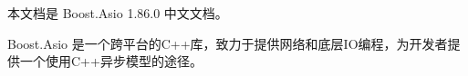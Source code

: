 \documentclass[utf8]{book}
\begin{document}
	本文档是 Boost.Asio 1.86.0 中文文档。
	
	Boost.Asio 是一个跨平台的C++库，致力于提供网络和底层IO编程，为开发者提供一个使用C++异步模型的途径。
	
	
	
	
	
\end{document}
